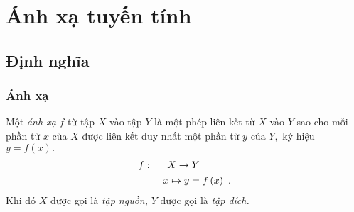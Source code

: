 \chapter{Ánh xạ tuyến tính}
\section{Định nghĩa}
\subsection{Ánh xạ}
Một \textit{ánh xạ} $f$ từ tập $X$ vào tập $Y$ là một phép liên kết từ $X$ vào $Y$ sao cho mỗi phần tử $x$ của $X$ được liên kết duy nhất một phần tử $y$ của $Y,$ ký hiệu $y = f \left( x \right).$
$$\begin{gathered}
  f:\begin{array}{*{20}{c}}
  {}&{X \to Y} 
\end{array} \hfill \\
  \begin{array}{*{20}{c}}
  {}&{}&{x \mapsto y = f\left( x \right)} 
\end{array}. \hfill \\ 
\end{gathered} $$
Khi đó $X$ được gọi là \textit{tập nguồn,} $Y$ được gọi là \textit{tập đích.}
